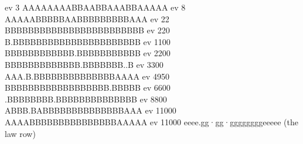 \begtt
ev     3   AAAAAAAABBAABBAAABBAAAAA
ev     8   AAAAABBBBBAABBBBBBBBBAAA
ev    22   BBBBBBBBBBBBBBBBBBBBBBBB
ev   220   B.BBBBBBBBBBBBBBBBBBBBBB
ev  1100   BBBBBBBBBBBB.BBBBBBBBBBB
ev  2200   BBBBBBBBBBBBB.BBBBBBB..B
ev  3300   AAA.B.BBBBBBBBBBBBBBAAAA
ev  4950   BBBBBBBBBBBBBBBBBB.BBBBB
ev  6600   .BBBBBBBB.BBBBBBBBBBBBBB
ev  8800   ABBB.BABBBBBBBBBBBBBBAAA
ev 11000   AAAABBBBBBBBBBBBBBBAAAAA
ev 11000   eeee.gg·gg·ggggggggeeeee   (the law row)
\endtt
